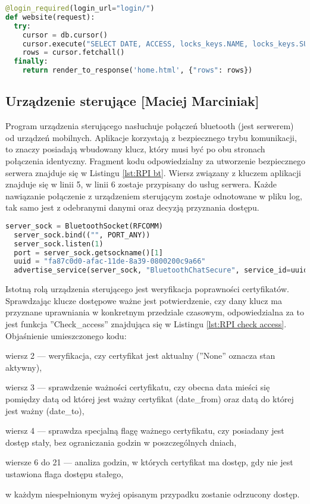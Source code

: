 \documentclass[twoside,10pt]{article}
\def\StudentA     {Maciej Marciniak}
\begin{document}
{\footnotesize 
\begin{lstlisting}[caption={API logowania do strony internetowej}, label={lst:serwer login strona}, language=Python]
@login_required(login_url="login/")
def website(request):
  try:
    cursor = db.cursor()
    cursor.execute("SELECT DATE, ACCESS, locks_keys.NAME, locks_keys.SURNAME, locks.NAME AS 'ZAMEK' FROM access_to_locks, locks_keys, locks WHERE locks_keys.ID_KEY = access_to_locks.ID_KEY AND locks.ID_LOCK = access_to_locks.ID_KEY ORDER BY DATE DESC")
    rows = cursor.fetchall()
  finally:
    return render_to_response('home.html', {"rows": rows})
\end{lstlisting}}
\subsection{Urządzenie sterujące [\StudentA]}
Program urządzenia sterującego nasłuchuje połączeń bluetooth (jest serwerem) od urządzeń mobilnych. Aplikacje korzystają z bezpiecznego trybu komunikacji, to znaczy posiadają wbudowany klucz, który musi być po obu stronach połączenia identyczny. Fragment kodu odpowiedzialny za utworzenie bezpiecznego serwera znajduje się w Listingu \ref{lst:RPI bt}. Wiersz związany z kluczem aplikacji znajduje się w linii 5, w linii 6 zostaje przypisany do usług serwera. Każde nawiązanie połączenie z urządzeniem sterującym zostaje odnotowane w pliku log, tak samo jest z odebranymi danymi oraz decyzją przyznania dostępu.

{\footnotesize 
\begin{lstlisting}[caption={Tworzenie serwera bluetooth}, label={lst:RPI bt}, language=Python]
  server_sock = BluetoothSocket(RFCOMM)
  server_sock.bind(("", PORT_ANY))
  server_sock.listen(1)
  port = server_sock.getsockname()[1]
  uuid = "fa87c0d0-afac-11de-8a39-0800200c9a66"
  advertise_service(server_sock, "BluetoothChatSecure", service_id=uuid, service_classes=[uuid, SERIAL_PORT_CLASS], profiles=[SERIAL_PORT_PROFILE])
\end{lstlisting}}
Istotną rolą urządzenia sterującego jest weryfikacja poprawności certyfikatów. Sprawdzając klucze dostępowe ważne jest potwierdzenie, czy dany klucz ma przyznane uprawniania w konkretnym przedziale czasowym, odpowiedzialna za to jest funkcja ''Check\_access'' znajdująca się w Listingu \ref{lst:RPI check access}. Objaśnienie umieszczonego kodu:
\begin{itemize*}
\item wiersz 2 --- weryfikacja, czy certyfikat jest aktualny (''None'' oznacza stan aktywny),
\item wiersz 3 --- sprawdzenie ważności certyfikatu, czy obecna data mieści się pomiędzy datą od której jest ważny certyfikat (date\_from) oraz datą do której jest ważny (date\_to),
\item  wiersz 4 --- sprawdza specjalną flagę ważnego certyfikatu, czy posiadany jest dostęp stały, bez ograniczania godzin w poszczególnych dniach,
\item wiersze 6 do 21 --- analiza godzin, w których certyfikat ma dostęp, gdy nie jest ustawiona flaga dostępu stałego,
\item w każdym niespełnionym wyżej opisanym przypadku zostanie odrzucony dostęp.
\end{itemize*}
\end{document}
